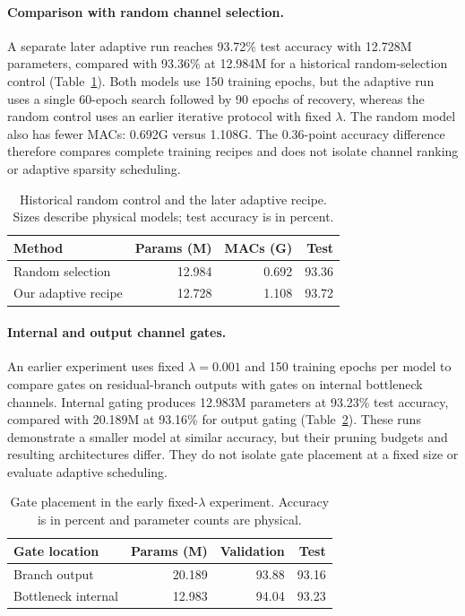 \paragraph{Comparison with random channel selection.}
A separate later adaptive run reaches 93.72\% test accuracy with
12.728M parameters, compared with 93.36\% at 12.984M for a
historical random-selection control (Table~\ref{tab:ablation-random}).
Both models use 150 training epochs, but the adaptive run uses a
single 60-epoch search followed by 90 epochs of recovery, whereas
the random control uses an earlier iterative protocol with fixed
$\lambda$. The random model also has fewer MACs: 0.692G versus
1.108G. The 0.36-point accuracy difference therefore compares
complete training recipes and does not isolate channel ranking
or adaptive sparsity scheduling.

\begin{table}[t]
  \centering
  \caption{Historical random control and the later adaptive recipe.
    Sizes describe physical models; test accuracy is in percent.}
  \label{tab:ablation-random}
  \small
  \setlength{\tabcolsep}{4pt}
  \begin{tabular}{@{}lrrr@{}}
    \toprule
    Method & Params (M) & MACs (G) & Test \\
    \midrule
    Random selection & 12.984 & 0.692 & 93.36 \\
    Our adaptive recipe & 12.728 & 1.108 & 93.72 \\
    \bottomrule
  \end{tabular}
\end{table}
\paragraph{Internal and output channel gates.}
An earlier experiment uses fixed $\lambda=0.001$ and 150 training
epochs per model to compare gates on residual-branch outputs with
gates on internal bottleneck channels. Internal gating produces
12.983M parameters at 93.23\% test accuracy, compared with
20.189M at 93.16\% for output gating
(Table~\ref{tab:ablation-gate-location}). These runs demonstrate
a smaller model at similar accuracy, but their pruning budgets
and resulting architectures differ. They do not isolate gate
placement at a fixed size or evaluate adaptive scheduling.

\begin{table}[t]
  \centering
  \caption{Gate placement in the early fixed-$\lambda$ experiment.
    Accuracy is in percent and parameter counts are physical.}
  \label{tab:ablation-gate-location}
  \begin{tabular}{@{}lrrr@{}}
    \toprule
    Gate location & Params (M) & Validation & Test \\
    \midrule
    Branch output & 20.189 & 93.88 & 93.16 \\
    Bottleneck internal & 12.983 & 94.04 & 93.23 \\
    \bottomrule
  \end{tabular}
\end{table}

